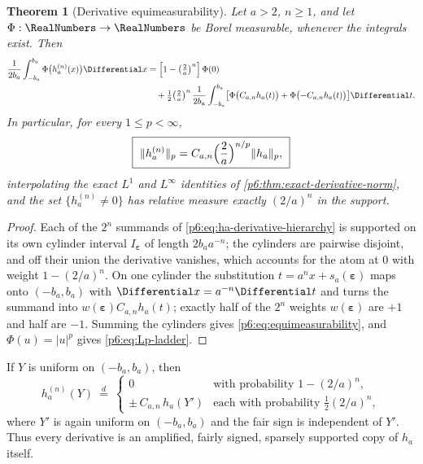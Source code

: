 \documentclass[11pt,oneside]{article}
\numberwithin{equation}{section}
\newtheorem{theorem}{Theorem}[section]
\theoremstyle{definition}
\theoremstyle{remark}
\begin{document}
\begin{theorem}[Derivative equimeasurability]\label{p6:thm:equimeasurability}
Let $a>2$, $n\ge1$, and let $\Phi:\RealNumbers\to\RealNumbers$ be Borel measurable, whenever the
integrals exist.  Then
\begin{align}
 \frac1{2b_a}\int_{-b_a}^{b_a}\Phi\bigl(h_a^{(n)}(x)\bigr)\Differential x
 &=\Bigl[1-\bigl(\tfrac2a\bigr)^{n}\Bigr]\,\Phi(0)
 \notag\\
 &\quad+\tfrac12\bigl(\tfrac2a\bigr)^{n}\,
  \frac1{2b_a}\int_{-b_a}^{b_a}
   \bigl[\Phi\bigl(C_{a,n}h_a(t)\bigr)
   +\Phi\bigl(-C_{a,n}h_a(t)\bigr)\bigr]\Differential t.
 \label{p6:eq:equimeasurability}
\end{align}
In particular, for every $1\le p<\infty$,
\begin{equation}\label{p6:eq:Lp-ladder}
 \boxed{\ \|h_a^{(n)}\|_p
 =C_{a,n}\Bigl(\frac2a\Bigr)^{n/p}\|h_a\|_p,\ }
\end{equation}
interpolating the exact $L^1$ and $L^\infty$ identities of
\cref{p6:thm:exact-derivative-norm}, and the set $\{h_a^{(n)}\ne0\}$ has
relative measure exactly $(2/a)^n$ in the support.
\end{theorem}

\begin{proof}
Each of the $2^n$ summands of \eqref{p6:eq:ha-derivative-hierarchy} is supported
on its own cylinder interval $I_{\boldsymbol\varepsilon}$ of length
$2b_aa^{-n}$; the cylinders are pairwise disjoint, and off their union the
derivative vanishes, which accounts for the atom at $0$ with weight
$1-(2/a)^n$.  On one cylinder the substitution
$t=a^nx+s_a(\boldsymbol\varepsilon)$ maps onto $(-b_a,b_a)$ with
$\Differential x=a^{-n}\Differential t$ and turns the summand into
$w(\boldsymbol\varepsilon)C_{a,n}h_a(t)$; exactly half of the $2^n$ weights
$w(\boldsymbol\varepsilon)$ are $+1$ and half are $-1$.  Summing the cylinders
gives \eqref{p6:eq:equimeasurability}, and $\Phi(u)=|u|^p$ gives
\eqref{p6:eq:Lp-ladder}.
\end{proof}

\begin{corollary}\label{p6:cor:derivative-mixture}
If $Y$ is uniform on $(-b_a,b_a)$, then
\[
 h_a^{(n)}(Y)\ \overset d=\
 \begin{cases}
  0 & \text{with probability }1-(2/a)^n,\\
  \pm\,C_{a,n}\,h_a(Y') & \text{each with probability }\tfrac12(2/a)^n,
 \end{cases}
\]
where $Y'$ is again uniform on $(-b_a,b_a)$ and the fair sign is independent
of $Y'$.  Thus every derivative is an amplified, fairly signed, sparsely
supported copy of $h_a$ itself.
\end{corollary}
\end{document}

